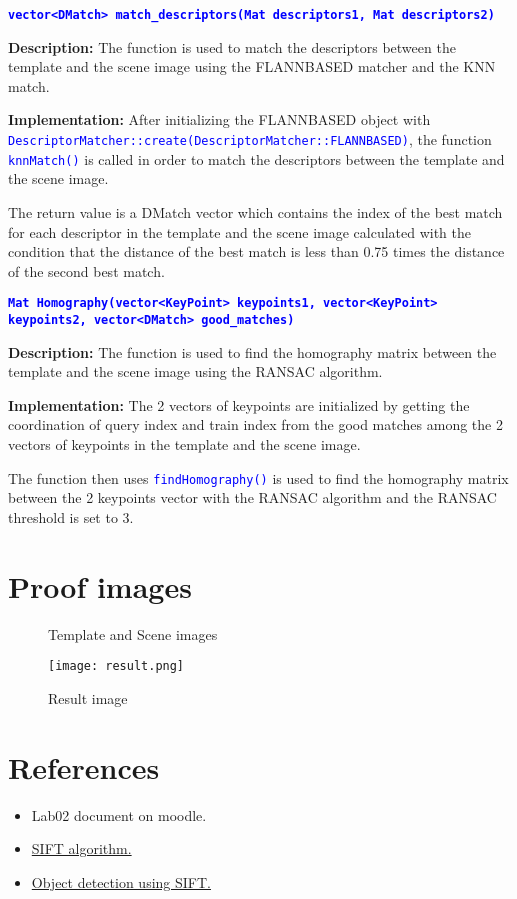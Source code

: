 \documentclass{report}
\begin{document}
\textbf{\textcolor{blue}{\lstinline|vector<DMatch> match_descriptors(Mat descriptors1, Mat descriptors2)|}}   

\textbf{Description:} The function is used to match the descriptors between the template and the scene image using the FLANNBASED matcher and the KNN match.

\textbf{Implementation:} After initializing the FLANNBASED object with \textcolor{blue}{\lstinline|DescriptorMatcher::create(DescriptorMatcher::FLANNBASED)|}, the function \textcolor{blue}{\lstinline|knnMatch()|} is called in order to match the descriptors between the template and the scene image.

The return value is a DMatch vector which contains the index of the best match for each descriptor in the template and the scene image calculated with the condition that the distance of the best match is less than 0.75 times the distance of the second best match.

\pagebreak
\textbf{\textcolor{blue}{\lstinline|Mat Homography(vector<KeyPoint> keypoints1, vector<KeyPoint> keypoints2, vector<DMatch> good_matches)|}}

\textbf{Description:} The function is used to find the homography matrix between the template and the scene image using the RANSAC algorithm.

\textbf{Implementation:} The 2 vectors of keypoints are initialized by getting the coordination of query index and train index from the good matches among the 2 vectors of keypoints in the template and the scene image.

The function then uses \textcolor{blue}{\lstinline|findHomography()|} is used to find the homography matrix between the 2 keypoints vector with the RANSAC algorithm and the RANSAC threshold is set to 3.

\section{Proof images}
\begin{figure}[h!]
  \centering
  \caption{Template and Scene images}
\end{figure}

\begin{figure}[h!]
  \centering
  \texttt{[image: result.png]}
  \caption{Result image}
\end{figure}

\pagebreak
\section{References}
\begin{itemize}
  \item[] Lab02 document on moodle.
  \item[] \href{https://medium.com/@deepanshut041/introduction-to-sift-scale-invariant-feature-transform-65d7f3a72d40}{SIFT algorithm.}
  \item[] \href{https://github.com/tdkhan/object-detection-SIFT}{Object detection using SIFT.}
\end{itemize}
\end{document}
